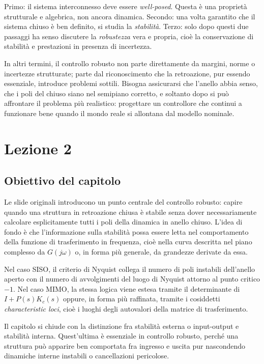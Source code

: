 \documentclass[11pt,a4paper]{article}
\begin{document}
Primo: il sistema interconnesso deve essere \emph{well-posed}. Questa è una proprietà strutturale e algebrica, non ancora dinamica. Secondo: una volta garantito che il sistema chiuso è ben definito, si studia la \emph{stabilità}. Terzo: solo dopo questi due passaggi ha senso discutere la \emph{robustezza} vera e propria, cioè la conservazione di stabilità e prestazioni in presenza di incertezza.

In altri termini, il controllo robusto non parte direttamente da margini, norme o incertezze strutturate; parte dal riconoscimento che la retroazione, pur essendo essenziale, introduce problemi sottili. Bisogna assicurarsi che l’anello abbia senso, che i poli del chiuso siano nel semipiano corretto, e soltanto dopo si può affrontare il problema più realistico: progettare un controllore che continui a funzionare bene quando il mondo reale si allontana dal modello nominale.

\newpage

\section{Lezione 2}

\subsection{Obiettivo del capitolo}

Le slide originali introducono un punto centrale del controllo robusto: capire quando una struttura in retroazione chiusa è stabile senza dover necessariamente calcolare esplicitamente tutti i poli della dinamica in anello chiuso. L’idea di fondo è che l’informazione sulla stabilità possa essere letta nel comportamento della funzione di trasferimento in frequenza, cioè nella curva descritta nel piano complesso da $G(j\omega)$ o, in forma più generale, da grandezze derivate da essa.

Nel caso SISO, il criterio di Nyquist collega il numero di poli instabili dell’anello aperto con il numero di avvolgimenti del luogo di Nyquist attorno al punto critico $-1$. Nel caso MIMO, la stessa logica viene estesa tramite il determinante di $I + P(s)K_c(s)$ oppure, in forma più raffinata, tramite i cosiddetti \emph{characteristic loci}, cioè i luoghi degli autovalori della matrice di trasferimento.

Il capitolo si chiude con la distinzione fra stabilità esterna o input-output e stabilità interna. Quest’ultima è essenziale in controllo robusto, perché una struttura può apparire ben comportata fra ingresso e uscita pur nascondendo dinamiche interne instabili o cancellazioni pericolose.
\end{document}
